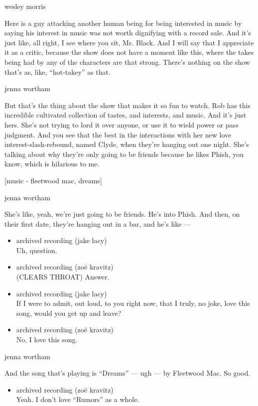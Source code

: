 wesley morris

Here is a guy attacking another human being for being interested in
music by saying his interest in music was not worth dignifying with a
record sale. And it's just like, all right, I see where you sit, Mr.
Black. And I will say that I appreciate it as a critic, because the show
does not have a moment like this, where the takes being had by any of
the characters are that strong. There's nothing on the show that's as,
like, ``hot-takey'' as that.

jenna wortham

But that's the thing about the show that makes it so fun to watch. Rob
has this incredible cultivated collection of tastes, and interests, and
music. And it's just hers. She's not trying to lord it over anyone, or
use it to wield power or pass judgment. And you see that the best in the
interactions with her new love interest-slash-rebound, named Clyde, when
they're hanging out one night. She's talking about why they're only
going to be friends because he likes Phish, you know, which is hilarious
to me.

{[}music - fleetwood mac, dreams{]}

jenna wortham

She's like, yeah, we're just going to be friends. He's into Phish. And
then, on their first date, they're hanging out in a bar, and he's like
---

\begin{itemize}
\item
  archived recording (jake lacy)\\
  Uh, question.
\item
  archived recording (zoë kravitz)\\
  (CLEARS THROAT) Answer.
\item
  archived recording (jake lacy)\\
  If I were to admit, out loud, to you right now, that I truly, no joke,
  love this song, would you get up and leave?
\item
  archived recording (zoë kravitz)\\
  No, I love this song.
\end{itemize}

jenna wortham

And the song that's playing is ``Dreams'' --- ugh --- by Fleetwood Mac.
So good.

\begin{itemize}
\tightlist
\item
  archived recording (zoë kravitz)\\
  Yeah. I don't love ``Rumors'' as a whole.
\end{itemize}

